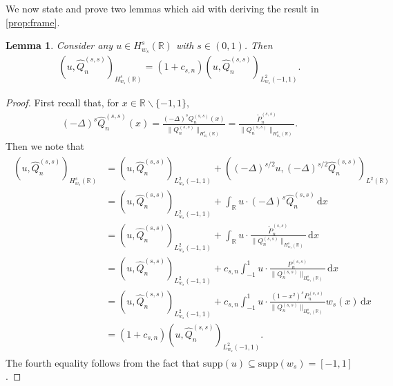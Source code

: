 \documentclass[10pt,a4paper]{article}
\newcommand{\dx}{\mathrm{d}x}
\newcommand{\supp}{\mathrm{supp}}
\newtheorem{lemma}{Lemma}[section]
\numberwithin{equation}{section}
\begin{document}
We now state and prove two lemmas which aid with deriving the result in \cref{prop:frame}.
\begin{lemma}
\label{lem:a}
Consider any $u \in H^s_{w_s}(\mathbb{R})$ with $s \in (0,1)$. Then
\begin{align}
(u, \hat{Q}_n^{(s,s)})_{H^s_{w_s}(\mathbb{R})} = (1+c_{s,n}) (u, \hat{Q}_n^{(s,s)})_{L^2_{w_s}(-1,1)}.
\end{align}
\end{lemma}
\begin{proof}
First recall that, for $x \in \mathbb{R}  \backslash \{-1, 1\}$,
\begin{align}
(-\Delta)^s \hat{Q}^{(s,s)}_n(x) 
= \frac{(-\Delta)^s {Q}^{(s,s)}_n(x)}{\| {Q}^{(s,s)}_n \|_{H^s_{w_s}(\mathbb{R})}}
=  \frac{\tilde{P}_n^{(s,s)}}{\|{Q}_n^{(s,s)}\|_{H^s_{w_s}(\mathbb{R})}}.
\end{align}
Then we note that
\begin{align}
\begin{split}
(u, \hat{Q}_n^{(s,s)})_{H^s_{w_s}(\mathbb{R})}  
&= (u, \hat{Q}_n^{(s,s)})_{L^2_{w_s}(-1,1)} + ((-\Delta)^{s/2} u, (-\Delta)^{s/2}\hat{Q}_n^{(s,s)})_{L^2(\mathbb{R})}\\
&= (u, \hat{Q}_n^{(s,s)})_{L^2_{w_s}(-1,1)} + \int_{\mathbb{R}} u \cdot (-\Delta)^{s} \hat{Q}_n^{(s,s)}\, \dx\\
& = (u, \hat{Q}_n^{(s,s)})_{L^2_{w_s}(-1,1)} + \int_{\mathbb{R}} u \cdot  \frac{{\tilde P}_n^{(s,s)}}{\|{Q}_n^{(s,s)}\|_{H^s_{w_s}(\mathbb{R})}} \, \dx\\
& = (u, \hat{Q}_n^{(s,s)})_{L^2_{w_s}(-1,1)} + c_{s,n} \int_{-1}^1 u \cdot  \frac{{P}_n^{(s,s)}}{\|{Q}_n^{(s,s)}\|_{H^s_{w_s}(\mathbb{R})}} \, \dx\\
& = (u, \hat{Q}_n^{(s,s)})_{L^2_{w_s}(-1,1)} + c_{s,n} \int_{-1}^1 u \cdot  \frac{(1-x^2)^s {P}_n^{(s,s)}}{\|{Q}_n^{(s,s)}\|_{H^s_{w_s}(\mathbb{R})}} w_s(x) \, \dx\\
& = (1+c_{s,n}) (u, \hat{Q}_n^{(s,s)})_{L^2_{w_s}(-1,1)}.
\end{split}
\end{align}
The fourth equality follows from the fact that $\supp(u) \subseteq \supp(w_s) = [-1,1]$. 
\end{proof}
\end{document}
